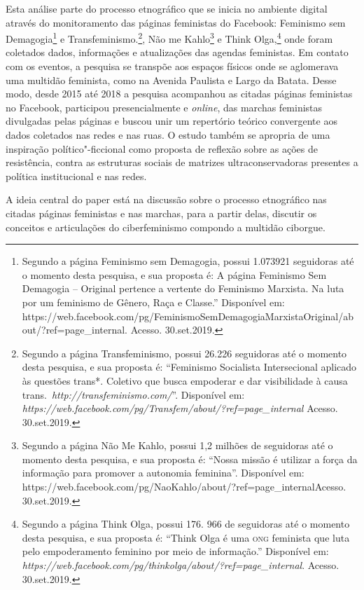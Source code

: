 \noindent{}Esta análise parte do processo etnográfico que se inicia no ambiente
digital através do monitoramento das páginas feministas do Facebook:
Feminismo sem Demagogia\footnote{Segundo a página Feminismo sem
  Demagogia, possui 1.073921 seguidoras até o momento
  desta pesquisa, e sua proposta é: A página Feminismo Sem Demagogia --
  Original pertence a vertente do Feminismo Marxista. Na luta por um
  feminismo de Gênero, Raça e Classe.''
  Disponível em:
  https://web.facebook.com/pg/FeminismoSemDemagogiaMarxistaOriginal/about/?ref=page\_internal.
  Acesso. 30.set.2019.} e Transfeminismo.\footnote{Segundo a página
  Transfeminismo, possui 26.226 seguidoras até o momento desta pesquisa,
  e sua proposta é: ``Feminismo Socialista Intersecional aplicado às
  questões trans*. Coletivo que busca empoderar e dar visibilidade à
  causa
  trans.~\emph{http://transfeminismo.com/}''.
  Disponível em:
  \emph{https://web.facebook.com/pg/Transfem/about/?ref=page\_internal}
  Acesso. 30.set.2019.}, Não me Kahlo\footnote{Segundo a página Não Me
  Kahlo, possui 1,2 milhões de seguidoras até o momento desta pesquisa,
  e sua proposta é: ``Nossa missão é utilizar a força da informação para
  promover a autonomia feminina''. Disponível em:
  https://web.facebook.com/pg/NaoKahlo/about/?ref=page\_internalAcesso.
  30.set.2019.} e Think Olga,\footnote{Segundo a página Think Olga,
  possui 176. 966 de seguidoras até o momento desta pesquisa, e sua
  proposta é: ``Think Olga é uma \textsc{ong} feminista que luta pelo
  empoderamento feminino por meio de informação.''
  Disponível em:
  \emph{https://web.facebook.com/pg/thinkolga/about/?ref=page\_internal}.
  Acesso. 30.set.2019.} onde foram coletados dados, informações e atualizações
das agendas feministas. Em contato com os eventos, a pesquisa se
transpõe aos espaços físicos onde se aglomerava uma multidão feminista,
como na Avenida Paulista e Largo da Batata. Desse modo, desde 2015 até
2018 a pesquisa acompanhou as citadas páginas feministas no Facebook,
participou presencialmente e \emph{online}, das marchas feministas divulgadas
pelas páginas e buscou unir um repertório teórico convergente aos dados
coletados nas redes e nas ruas. O estudo também se apropria de uma
inspiração político"-ficcional como proposta de reflexão sobre as ações
de resistência, contra as estruturas sociais de matrizes
ultraconservadoras presentes a política institucional e nas redes.

A ideia central do paper está na discussão sobre o processo etnográfico
nas citadas páginas feministas e nas marchas, para a partir delas,
discutir os conceitos e articulações do ciberfeminismo compondo a
multidão ciborgue.

